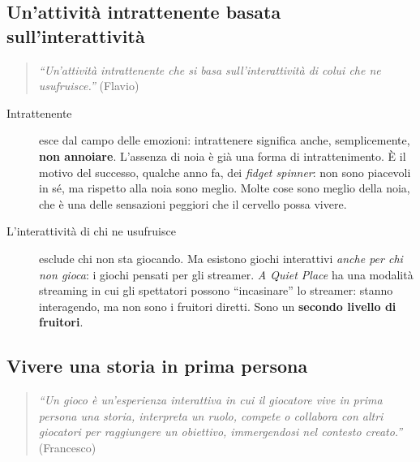 \subsection{Un'attività intrattenente basata sull'interattività}

\begin{quote}
\emph{``Un'attività intrattenente che si basa sull'interattività di colui che
ne usufruisce.''} (Flavio)
\end{quote}

\begin{description}
  \item[Intrattenente] esce dal campo delle emozioni: intrattenere significa
        anche, semplicemente, \textbf{non annoiare}. L'assenza di noia è già
        una forma di intrattenimento. È il motivo del successo, qualche anno
        fa, dei \emph{fidget spinner}: non sono piacevoli in sé, ma rispetto
        alla noia sono meglio. Molte cose sono meglio della noia, che è una
        delle sensazioni peggiori che il cervello possa vivere.
  \item[L'interattività di chi ne usufruisce] esclude chi non sta giocando.
        Ma esistono giochi interattivi \emph{anche per chi non gioca}: i giochi
        pensati per gli streamer. \emph{A Quiet Place} ha una modalità
        streaming in cui gli spettatori possono ``incasinare'' lo streamer:
        stanno interagendo, ma non sono i fruitori diretti. Sono un
        \textbf{secondo livello di fruitori}.
\end{description}

\subsection{Vivere una storia in prima persona}

\begin{quote}
\emph{``Un gioco è un'esperienza interattiva in cui il giocatore vive in prima
persona una storia, interpreta un ruolo, compete o collabora con altri
giocatori per raggiungere un obiettivo, immergendosi nel contesto creato.''}
(Francesco)
\end{quote}

